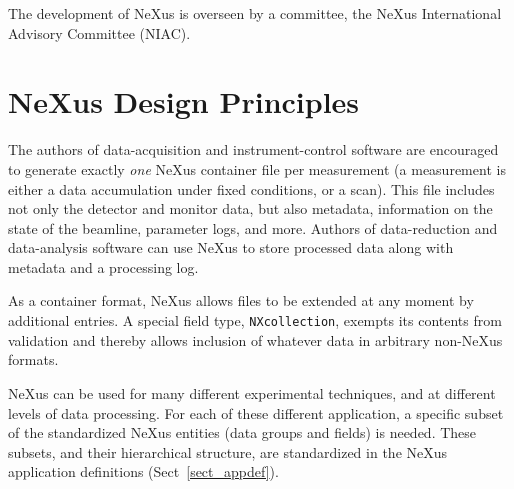 \documentclass[%
 aip,
rsi,
 amsmath,amssymb,
 reprint,%
]{revtex4-1}
\begin{document}
The development of NeXus is overseen by a committee, the NeXus International Advisory Committee (NIAC).

\section{NeXus Design Principles}

The authors of data-acquisition and instrument-control software are encouraged to generate exactly \emph{one} NeXus container file per measurement
(a measurement is either a data accumulation under fixed conditions,
or a scan).
This file includes not only the detector and monitor data,
but also metadata, information on the state of the beamline, parameter logs, and more.
Authors of data-reduction and data-analysis software can use NeXus to
store processed data along with metadata and a processing log.

As a container format, NeXus allows files to be extended at any moment by
additional entries.
A special field type, \texttt{NXcollection}, exempts its contents from validation
and thereby allows inclusion of whatever data in arbitrary non-NeXus formats.

NeXus can be used for many different experimental techniques,
and at different levels of data processing.
For each of these different application,
a specific subset of the standardized NeXus entities 
(data groups and fields) is needed.
These subsets, and their hierarchical structure, are standardized
in the NeXus application definitions (Sect~\ref{sect_appdef}).
\end{document}
